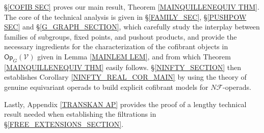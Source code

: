 \documentclass[a4paper,10pt
,draft
]{article}%
\numberwithin{equation}{section}
\numberwithin{figure}{section}
\theoremstyle{definition} %
\newcommand{\1}{\ensuremath{\mathbbm 1}}%
\begin{document}
\S \ref{COFIB SEC} proves our main result,
Theorem \ref{MAINQUILLENEQUIV THM}.
The core of the technical analysis 
is given in 
\S \ref{FAMILY_SEC},
\S \ref{PUSHPOW SEC}
and \S \ref{G_GRAPH_SECTION}, 
which carefully study the interplay between families of subgroups, fixed points, and pushout products,
and provide the necessary ingredients for
the characterization of the cofibrant objects
in $\mathsf{Op}_G (\mathcal{V})$
given in Lemma \ref{MAINLEM LEM},
and from which 
Theorem \ref{MAINQUILLENEQUIV THM}
easily follows.
\S \ref{NINFTY_SECTION}
then establishes Corollary 
\ref{NINFTY_REAL_COR_MAIN}
by using the theory of genuine equivariant operads
to build explicit cofibrant models for 
$N \mathcal{F}$-operads.

Lastly,
Appendix \ref{TRANSKAN AP}
provides the proof of a lengthy technical result needed when establishing the filtrations in \S \ref{FREE_EXTENSIONS_SECTION}.



\end{document}
